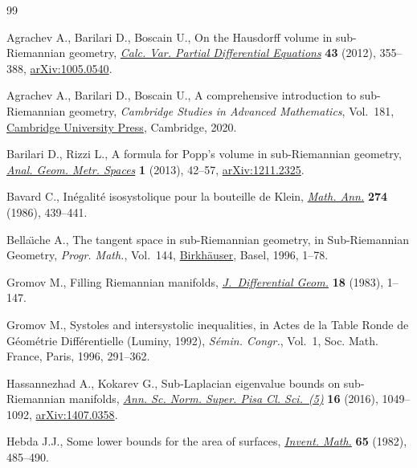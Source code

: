 \documentclass[pdftex]{sigma}
\numberwithin{equation}{section}
\begin{document}
\begin{thebibliography}{99}
\footnotesize\itemsep=0pt

Agrachev A., Barilari D., Boscain U., On the {H}ausdorff volume in
 sub-{R}iemannian geometry, \href{https://doi.org/10.1007/s00526-011-0414-y}{\textit{Calc. Var. Partial Differential Equations}}
 \textbf{43} (2012), 355--388, \href{https://arxiv.org/abs/1005.0540}{arXiv:1005.0540}.

Agrachev A., Barilari D., Boscain U., A comprehensive introduction to
 sub-{R}iemannian geometry, \textit{Cambridge Studies in Advanced
 Mathematics}, Vol.~181, \href{https://doi.org/10.1017/9781108677325}{Cambridge University Press}, Cambridge, 2020.

Barilari D., Rizzi L., A formula for {P}opp's volume in sub-{R}iemannian
 geometry, \href{https://doi.org/10.2478/agms-2012-0004}{\textit{Anal. Geom. Metr. Spaces}} \textbf{1} (2013), 42--57,
 \href{https://arxiv.org/abs/1211.2325}{arXiv:1211.2325}.

Bavard C., In\'egalit\'e isosystolique pour la bouteille de {K}lein,
 \href{https://doi.org/10.1007/BF01457227}{\textit{Math. Ann.}} \textbf{274} (1986), 439--441.

Bella\"{\i}che A., The tangent space in sub-{R}iemannian geometry, in
 Sub-{R}iemannian Geometry, \textit{Progr. Math.}, Vol.~144, \href{https://doi.org/10.1007/978-3-0348-9210-0_1}{Birkh\"auser},
 Basel, 1996, 1--78.

Gromov M., Filling {R}iemannian manifolds, \href{https://doi.org/10.4310/jdg/1214509283}{\textit{J.~Differential Geom.}}
 \textbf{18} (1983), 1--147.

Gromov M., Systoles and intersystolic inequalities, in Actes de la {T}able
 {R}onde de {G}\'eom\'etrie {D}iff\'erentielle ({L}uminy, 1992),
 \textit{S\'emin. Congr.}, Vol.~1, Soc. Math. France, Paris, 1996, 291--362.

Hassannezhad A., Kokarev G., Sub-{L}aplacian eigenvalue bounds on
 sub-{R}iemannian manifolds, \href{https://doi.org/10.2422/2036-2145.201409_005}{\textit{Ann. Sc. Norm. Super. Pisa Cl. Sci.~(5)}}
 \textbf{16} (2016), 1049--1092, \href{https://arxiv.org/abs/1407.0358}{arXiv:1407.0358}.

Hebda J.J., Some lower bounds for the area of surfaces, \href{https://doi.org/10.1007/BF01396632}{\textit{Invent. Math.}}
 \textbf{65} (1982), 485--490.


\end{thebibliography}
\end{document}
